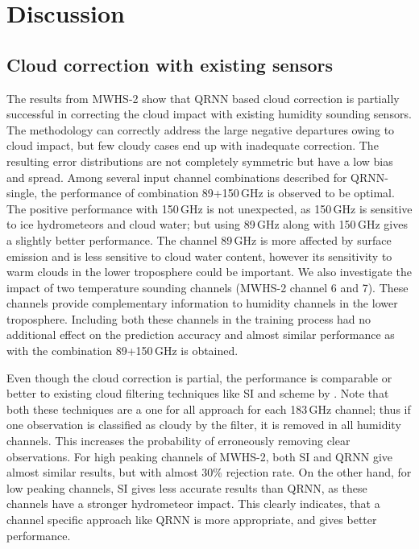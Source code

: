 \documentclass[amt, manuscript]{copernicus}
\begin{document}
\section{Discussion}
\label{discussions}

\subsection{Cloud correction with existing sensors}
%
The results from MWHS-2 show that QRNN based cloud correction is partially successful in correcting the cloud impact with existing humidity sounding sensors. The methodology can correctly address the large negative departures owing to cloud impact, but few cloudy cases end up with inadequate correction. The resulting error distributions are not completely symmetric but have a low bias and spread. Among several input channel combinations described for QRNN-single, the performance of combination 89+150\,GHz is observed to be optimal. The positive performance with 150\,GHz is not unexpected, as 150\,GHz is sensitive to ice hydrometeors and cloud water; but using 89\,GHz along with 150\,GHz gives a slightly better performance. The channel 89\,GHz is more affected by surface emission and is less sensitive to cloud water content, however its sensitivity to warm clouds in the lower troposphere could be important. We also investigate the impact of two temperature sounding channels (MWHS-2 channel 6 and 7). These channels provide complementary information to humidity channels in the lower troposphere. Including both these channels in the training process had no additional effect on the prediction accuracy and almost similar performance as with the combination 89+150\,GHz is obtained. 

Even though the cloud correction is partial, the performance is comparable or better to existing cloud filtering techniques like SI and scheme by \cite{buehler:aclou:07}. Note that both these techniques are a one for all approach for each 183\,GHz channel; thus if one observation is classified as cloudy by the filter, it is removed in all humidity channels. This increases the probability of erroneously removing clear observations. For high peaking channels of MWHS-2, both SI and QRNN give almost similar results, but with almost 30\% rejection rate. On the other hand, for low peaking channels, SI gives less accurate results than QRNN, as these channels have a stronger hydrometeor impact. This clearly indicates, that a channel specific approach like QRNN is more appropriate, and gives better performance. 
\end{document}
